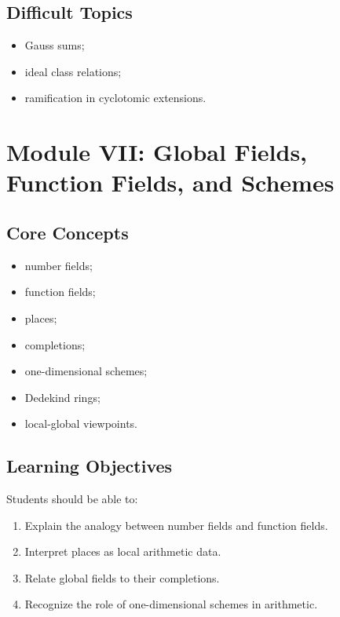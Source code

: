\documentclass[11pt,a4paper]{article}
\begin{document}
\subsection{Difficult Topics}

\begin{itemize}
    \item Gauss sums;
    \item ideal class relations;
    \item ramification in cyclotomic extensions.
\end{itemize}

\section{Module VII: Global Fields, Function Fields, and Schemes}

\subsection{Core Concepts}

\begin{itemize}
    \item number fields;
    \item function fields;
    \item places;
    \item completions;
    \item one-dimensional schemes;
    \item Dedekind rings;
    \item local-global viewpoints.
\end{itemize}

\subsection{Learning Objectives}

Students should be able to:

\begin{enumerate}
    \item Explain the analogy between number fields and function fields.
    \item Interpret places as local arithmetic data.
    \item Relate global fields to their completions.
    \item Recognize the role of one-dimensional schemes in arithmetic.
\end{enumerate}
\end{document}

